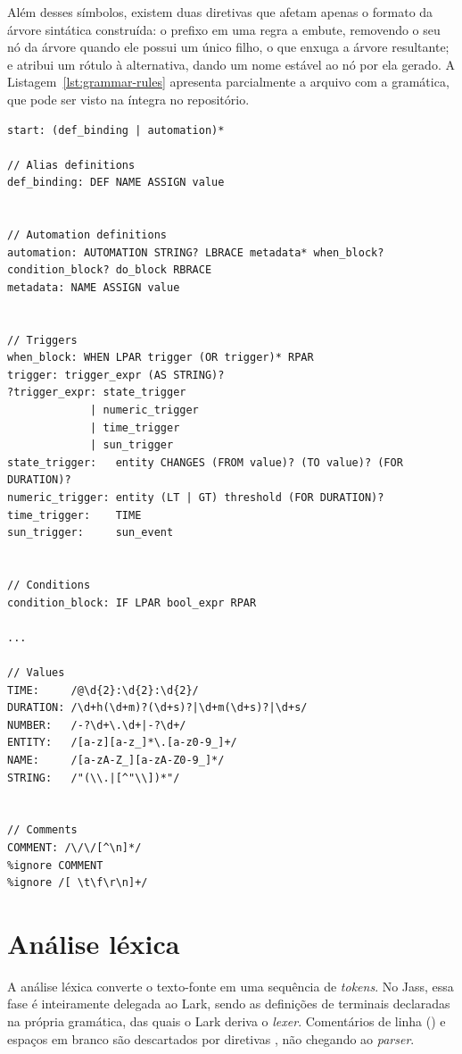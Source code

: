 \documentclass[12pt]{article}
\renewcommand\texttt[1]{\svtt{\small#1}}
\begin{document}
Além desses símbolos, existem duas diretivas que afetam apenas o formato da árvore sintática construída: o prefixo \texttt{?} em uma regra a embute,
removendo o seu nó da árvore quando ele possui um único filho, o que enxuga a
árvore resultante; e \texttt{->\ nome} atribui um rótulo à
alternativa, dando um nome estável ao nó por ela gerado. A Listagem~\ref{lst:grammar-rules} apresenta parcialmente a arquivo com a gramática, que pode ser visto na íntegra no repositório.

\begin{listing}[H]
    \centering
    \begin{verbatim}
start: (def_binding | automation)*

// Alias definitions
def_binding: DEF NAME ASSIGN value


// Automation definitions
automation: AUTOMATION STRING? LBRACE metadata* when_block? condition_block? do_block RBRACE
metadata: NAME ASSIGN value


// Triggers
when_block: WHEN LPAR trigger (OR trigger)* RPAR
trigger: trigger_expr (AS STRING)?
?trigger_expr: state_trigger
             | numeric_trigger
             | time_trigger
             | sun_trigger
state_trigger:   entity CHANGES (FROM value)? (TO value)? (FOR DURATION)?
numeric_trigger: entity (LT | GT) threshold (FOR DURATION)?
time_trigger:    TIME
sun_trigger:     sun_event


// Conditions
condition_block: IF LPAR bool_expr RPAR

...

// Values
TIME:     /@\d{2}:\d{2}:\d{2}/
DURATION: /\d+h(\d+m)?(\d+s)?|\d+m(\d+s)?|\d+s/
NUMBER:   /-?\d+\.\d+|-?\d+/
ENTITY:   /[a-z][a-z_]*\.[a-z0-9_]+/
NAME:     /[a-zA-Z_][a-zA-Z0-9_]*/
STRING:   /"(\\.|[^"\\])*"/


// Comments
COMMENT: /\/\/[^\n]*/
%ignore COMMENT
%ignore /[ \t\f\r\n]+/

    \end{verbatim}
    \caption{Conteúdo parcial da gramática com os não-terminais e os terminais.}
    \label{lst:grammar-rules}
\end{listing}

\section{Análise léxica}

A análise léxica converte o texto-fonte em uma sequência de
\emph{tokens}. No Jass, essa fase é inteiramente delegada ao
Lark, sendo as definições de terminais declaradas na própria
gramática, das quais o Lark deriva o \emph{lexer}. Comentários de linha (\texttt{//\ ...}) e espaços em branco são
descartados por diretivas \texttt{\%ignore}, não chegando ao
\emph{parser}. 
\end{document}

